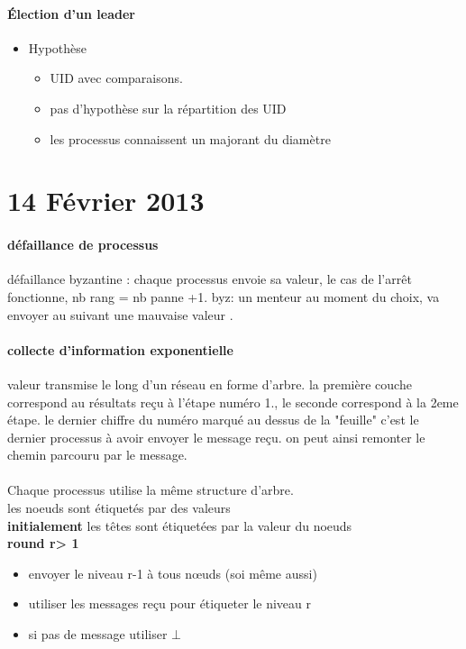 \documentclass{article}
\begin{document}
\paragraph{Élection d'un leader}
\begin{itemize}
\item Hypothèse
\begin{itemize}
\item UID avec comparaisons.
\item pas d'hypothèse sur la répartition des UID
\item les processus connaissent un majorant du diamètre
\end{itemize}
\end{itemize}

\section{14 Février 2013}

\paragraph{défaillance de processus} défaillance byzantine : chaque processus envoie sa valeur, le cas de l’arrêt fonctionne, nb rang = nb panne +1. byz: un menteur au moment du choix, va envoyer au suivant une mauvaise valeur .
\paragraph{collecte d'information exponentielle} valeur transmise le long d'un réseau en forme d'arbre. la première couche correspond au résultats reçu à l'étape numéro 1., le seconde correspond à la 2eme étape. le dernier chiffre du numéro marqué au dessus de la "feuille" c’est le dernier processus à avoir envoyer le message reçu. on peut ainsi remonter le chemin parcouru par le message.\\\\Chaque processus utilise la même structure d'arbre.\\les noeuds sont étiquetés par des valeurs\\\textbf{initialement} les têtes sont étiquetées par la valeur du noeuds\\\textbf{round r> 1} \begin{itemize}
\item envoyer le niveau r-1 à tous nœuds (soi même aussi)
\item utiliser les messages reçu pour étiqueter le niveau r
\item si pas de message utiliser $\bot$
\end{itemize}
\end{document}

